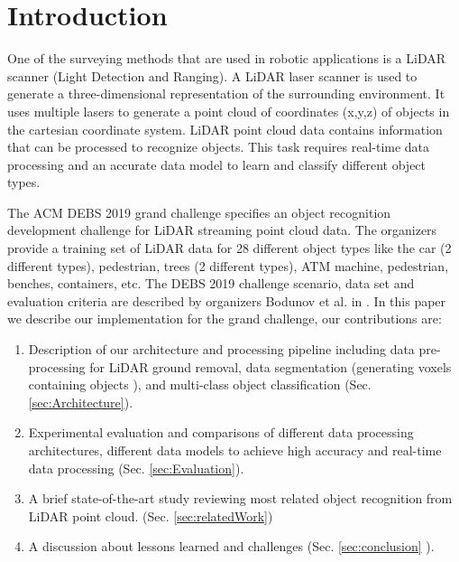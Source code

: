 \documentclass[sigconf]{acmart}
\begin{document}
\section{Introduction}

One of the surveying methods that are used in robotic applications is a LiDAR scanner (Light
Detection and Ranging). A LiDAR laser scanner is used to generate a three-dimensional representation of the surrounding environment. It uses multiple lasers to generate a point cloud of coordinates (x,y,z) of objects in the cartesian coordinate system. LiDAR point cloud data contains information that can be processed to recognize objects. This task requires real-time data processing and an accurate data model to learn and classify different object types.

The ACM DEBS 2019 grand challenge \cite{DEBSGC2019} specifies an object recognition development challenge for LiDAR streaming point cloud data.
The organizers provide a training set of LiDAR data for 28 different object types like the car (2 different types), pedestrian, trees (2 different types),
 ATM machine, pedestrian, benches, containers, etc. The DEBS 2019 challenge scenario, data set and evaluation criteria are described by organizers Bodunov et al. in \cite{DEBSGC2019}.
In this paper we describe our implementation for the grand challenge, our contributions are:


\begin{enumerate}

  \item Description of our %
  architecture and processing pipeline including data pre-processing for LiDAR ground removal,
  data segmentation (generating voxels containing objects ), and multi-class object classification  (Sec.  \ref{sec:Architecture}).
  \item Experimental evaluation and comparisons of different data processing architectures, different data models to achieve high
  accuracy and real-time data processing (Sec. \ref{sec:Evaluation}).
  \item A brief state-of-the-art study reviewing most related object recognition from LiDAR point cloud.  (Sec. \ref{sec:relatedWork})
  \item A discussion about lessons learned and challenges (Sec. \ref{sec:conclusion} ).
\end{enumerate}
\end{document}
